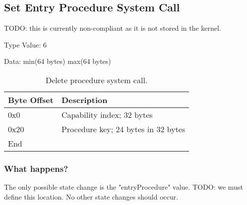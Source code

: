 \documentclass[english,a4paper]{article}
\let\oldparagraph\subsubsection
\renewcommand{\subsubsection}[1]{\oldparagraph{#1}\mbox{}}
\begin{document}
\subsection{Set Entry Procedure System Call}
TODO: this is currently non-compliant as it is not stored in the kernel.

Type Value: 6

Data: min(64 bytes) max(64 bytes)

\begin{table}[H]
  \caption{Delete procedure system call.}
  \centering{}%
  \begin{tabular}{l|p{}}
    \hline
    Byte Offset & Description\tabularnewline
    \hline
    \hline
    0x0 & Capability index; 32 bytes \tabularnewline
    0x20 & Procedure key; 24 bytes in 32 bytes \tabularnewline
    \hline
    End &  \tabularnewline
    \hline
  \end{tabular}
\end{table}

\subsubsection{What happens?}
The only possible state change is the "entryProcedure" value. TODO: we must
define this location. No other state changes should occur.
\end{document}
